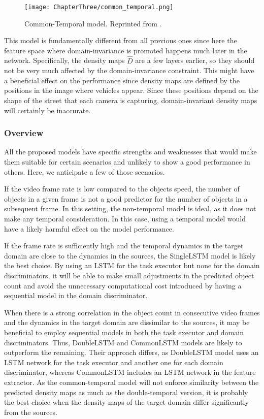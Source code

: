 \begin{figure}[!ht]
	\centering
	\texttt{[image: ChapterThree/common\_temporal.png]}
	\caption{Common-Temporal model. Reprinted from \citet{ThesisFrancisco}.}
	\label{fig:common_temporal_model}
\end{figure}

This model is fundamentally different from all previous ones since here the feature space where domain-invariance is promoted happens much later in the network. Specifically, the density maps $\widehat{D}$ are a few layers earlier, so they should not be very much affected by the domain-invariance constraint. This might have a beneficial effect on the performance since density maps are defined by the positions in the image where vehicles appear. Since these positions depend on the shape of the street that each camera is capturing, domain-invariant density maps will certainly be inaccurate.

\subsubsection{Overview}

All the proposed models have specific strengths and weaknesses that would make them suitable for certain scenarios and unlikely to show a good performance in others. Here, we anticipate a few of those scenarios.

If the video frame rate is low compared to the objects speed, the number of objects in a given frame is not a good predictor for the number of objects in a subsequent frame. In this setting, the non-temporal model is ideal, as it does not make any temporal consideration. In this case, using a temporal model would have a likely harmful effect on the model performance.

If the frame rate is sufficiently high and the temporal dynamics in the target domain are close to the dynamics in the sources, the SingleLSTM model is likely the best choice. By using an LSTM for the task executor but none for the domain discriminators, it will be able to make small adjustments in the predicted object count and avoid the unnecessary computational cost introduced by having a sequential model in the domain discriminator.

When there is a strong correlation in the object count in consecutive video frames and the dynamics in the target domain are dissimilar to the sources, it may be beneficial to employ sequential models in both the task executor and domain discriminators. Thus, DoubleLSTM and CommonLSTM models are likely to outperform the remaining. Their approach differs, as DoubleLSTM model uses an LSTM network for the task executor and another one for each domain discriminator, whereas CommonLSTM includes an LSTM network in the feature extractor. As the common-temporal model will not enforce similarity between the predicted density maps as much as the double-temporal version, it is probably the best choice when the density maps of the target domain differ significantly from the sources.

